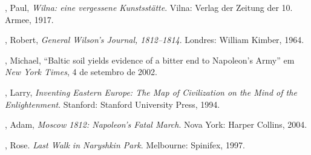 \begin{bibliohedra}
, Paul, \textit{Wilna: eine vergessene Kunstsstätte}. Vilna: Verlag
der Zeitung der 10. Armee, 1917.

, Robert, \textit{General Wilson's Journal, 1812--1814}. Londres: William Kimber, 1964.

, Michael, ``Baltic soil yields evidence of a bitter end to
Napoleon's Army'' em \textit{New York Times}, 4 de setembro de 2002.

, Larry, \textit{Inventing Eastern Europe: The Map of Civilization on
the Mind of the Enlightenment}. Stanford: Stanford University Press,
1994.

, Adam, \textit{Moscow 1812: Napoleon's Fatal March}. Nova York:
Harper Collins, 2004. \EP[1]

, Rose. \textit{Last Walk in Naryshkin Park}. Melbourne:
Spinifex, 1997.
\end{bibliohedra}



